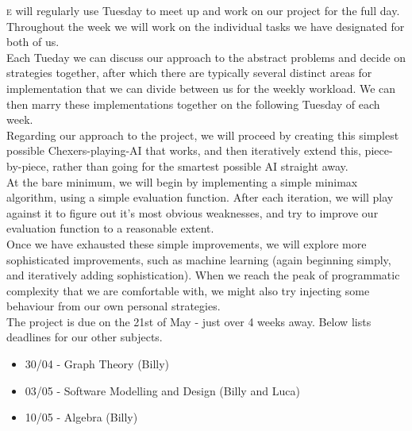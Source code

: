 \documentclass{article}[11pt]
\begin{document}
\lettrine[lines=2]{}e will regularly use Tuesday to meet up and work on our project for the full day. Throughout the week we will work on the individual tasks we have designated for both of us.\\

Each Tueday we can discuss our approach to the abstract problems and decide on strategies together, after which there are typically several distinct areas for implementation that we can divide between us for the weekly workload. We can then marry these implementations together on the following Tuesday of each week.\\

Regarding our approach to the project, we will proceed by creating this simplest possible Chexers-playing-AI that works, and then iteratively extend this, piece-by-piece, rather than going for the smartest possible AI straight away.\\

At the bare minimum, we will begin by implementing a simple minimax algorithm, using a simple evaluation function. After each iteration, we will play against it to figure out it's most obvious weaknesses, and try to improve our evaluation function to a reasonable extent.\\

Once we have exhausted these simple improvements, we will explore more sophisticated improvements, such as machine learning (again beginning simply, and iteratively adding sophistication). When we reach the peak of programmatic complexity that we are comfortable with, we might also try injecting some behaviour from our own personal strategies.\\

The project is due on the 21st of May - just over 4 weeks away. Below lists deadlines for our other subjects.
\begin{itemize}
    \item 30/04 - Graph Theory (Billy)
    \item 03/05 - Software Modelling and Design (Billy and Luca)
    \item 10/05 - Algebra (Billy)
\end{itemize}
\end{document}
